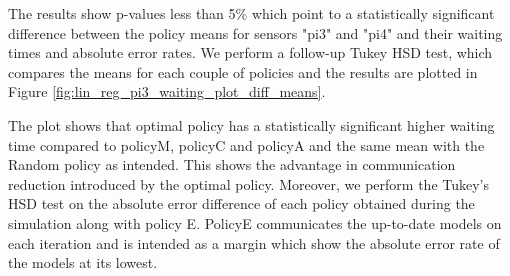 \documentclass{mpaper}
\begin{document}
The results show p-values less than 5\% which point to a statistically significant difference between the policy means for sensors "pi3" and "pi4" and their waiting times and absolute error rates. We perform a follow-up Tukey HSD test, which compares the means for each couple of policies and the results are plotted in Figure \ref{fig:lin_reg_pi3_waiting_plot_diff_means}.

The plot shows that optimal policy has a statistically significant higher waiting time compared to policyM, policyC and policyA and the same mean with the Random policy as intended.
This shows the advantage in communication reduction introduced by the optimal policy.
Moreover, we perform the Tukey's HSD test on the absolute error difference of each policy obtained during the simulation along with policy E. PolicyE communicates the up-to-date models on each iteration and is intended as a margin which show the absolute error rate of the models at its lowest. 
\end{document}
